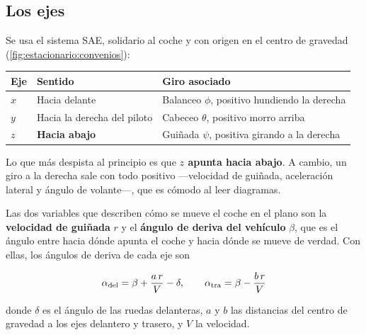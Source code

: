 \subsection{Los ejes}

Se usa el sistema SAE, solidario al coche y con origen en el centro de
gravedad (\cref{fig:estacionario:convenios}):

\begin{center}
\begin{tabularx}{\textwidth}{@{}llX@{}}
\toprule
\textbf{Eje} & \textbf{Sentido} & \textbf{Giro asociado} \\
\midrule
$x$ & Hacia delante & Balanceo $\phi$, positivo hundiendo la derecha \\
$y$ & Hacia la derecha del piloto & Cabeceo $\theta$, positivo morro arriba \\
$z$ & \textbf{Hacia abajo} & Guiñada $\psi$, positiva girando a la derecha \\
\bottomrule
\end{tabularx}
\end{center}

Lo que más despista al principio es que \textbf{$z$ apunta hacia abajo}. A
cambio, un giro a la derecha sale con todo positivo ---velocidad de guiñada,
aceleración lateral y ángulo de volante---, que es cómodo al leer diagramas.

Las dos variables que describen cómo se mueve el coche en el plano son la
\textbf{velocidad de guiñada} $r$ y el \textbf{ángulo de deriva del vehículo}
$\beta$, que es el ángulo entre hacia dónde apunta el coche y hacia dónde se
mueve de verdad. Con ellas, los ángulos de deriva de cada eje son

\begin{equation}
  \alpha_{\text{del}} = \beta + \frac{a\,r}{V} - \delta,
  \qquad
  \alpha_{\text{tra}} = \beta - \frac{b\,r}{V}
  \label{eq:slip_ejes}
\end{equation}

donde $\delta$ es el ángulo de las ruedas delanteras, $a$ y $b$ las distancias
del centro de gravedad a los ejes delantero y trasero, y $V$ la velocidad.

